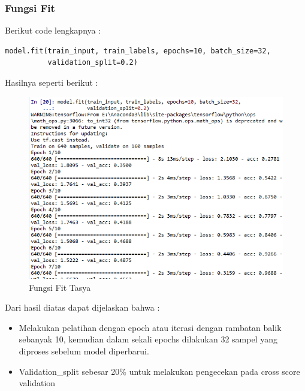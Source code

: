 \subsubsection{Fungsi Fit}
Berikut code lengkapnya :
\begin{verbatim}
model.fit(train_input, train_labels, epochs=10, batch_size=32,
          validation_split=0.2)
\end{verbatim}
Hasilnya seperti berikut :\\
\begin{figure}[ht]
\centering
\includegraphics[scale=0.5]{figures/chapter6tasya19.png}
\caption{Fungsi Fit Tasya}
\label{Praktek}
\end{figure}
Dari hasil diatas dapat dijelaskan bahwa :\\
\begin{itemize}
\item Melakukan pelatihan dengan epoch atau iterasi dengan rambatan balik sebanyak 10, kemudian dalam sekali epochs dilakukan 32  sampel yang diproses sebelum model diperbarui.
\item Validation\_split sebesar 20\% untuk melakukan pengecekan pada cross score validation
\end{itemize}

